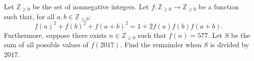 Let $\mathbb{Z}_{\geq 0}$ be the set of nonnegative integers. Let $f: \mathbb{Z}_{\geq0} \to \mathbb{Z}_{\geq0}$ be a function such that, for all $a,b \in \mathbb{Z}_{\geq0}$: \[f(a)^2+f(b)^2+f(a+b)^2=1+2f(a)f(b)f(a+b).\] Furthermore, suppose there exists $n \in \mathbb{Z}_{\geq0}$ such that $f(n)=577$. Let $S$ be the sum of all possible values of $f(2017)$. Find the remainder when $S$ is divided by $2017$.
